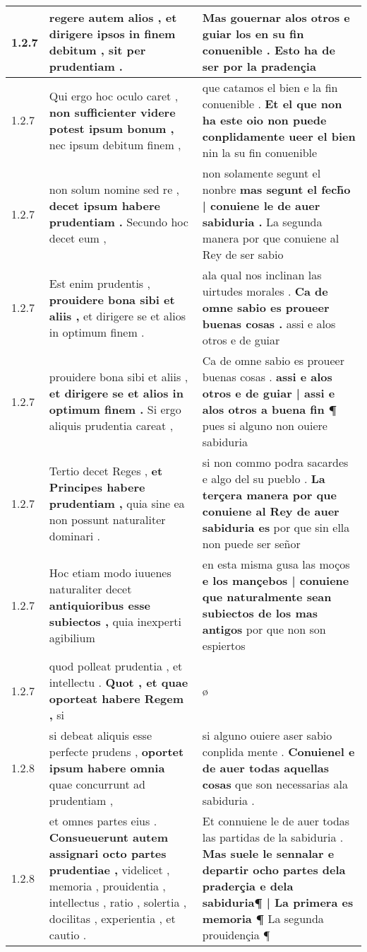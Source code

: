 \begin{tabular}{|p{1cm}|p{6.5cm}|p{6.5cm}|}
1.2.7 & regere autem alios , \textbf{ et dirigere ipsos in finem debitum , } sit per prudentiam . & Mas gouernar alos otros \textbf{ e guiar los en su fin conuenible . } Esto ha de ser por la pradençia \\\hline
1.2.7 & Qui ergo hoc oculo caret , \textbf{ non sufficienter videre potest ipsum bonum , } nec ipsum debitum finem , & que catamos el bien e la fin conuenible . \textbf{ Et el que non ha este oio non puede conplidamente ueer el bien } nin la su fin conuenible \\\hline
1.2.7 & non solum nomine sed re , \textbf{ decet ipsum habere prudentiam . } Secundo hoc decet eum , & non solamente segunt el nonbre \textbf{ mas segunt el fech̃o | conuiene le de auer sabiduria . } La segunda manera por que conuiene al Rey de ser sabio \\\hline
1.2.7 & Est enim prudentis , \textbf{ prouidere bona sibi et aliis , } et dirigere se et alios in optimum finem . & ala qual nos inclinan las uirtudes morales . \textbf{ Ca de omne sabio es proueer buenas cosas . } assi e alos otros e de guiar \\\hline
1.2.7 & prouidere bona sibi et aliis , \textbf{ et dirigere se et alios in optimum finem . } Si ergo aliquis prudentia careat , & Ca de omne sabio es proueer buenas cosas . \textbf{ assi e alos otros e de guiar | assi e alos otros a buena fin ¶ } pues si alguno non ouiere sabiduria \\\hline
1.2.7 & Tertio decet Reges , \textbf{ et Principes habere prudentiam , } quia sine ea non possunt naturaliter dominari . & si non commo podra sacardes e algo del su pueblo . \textbf{ La terçera manera por que conuiene al Rey de auer sabiduria es } por que sin ella non puede ser señor \\\hline
1.2.7 & Hoc etiam modo iuuenes naturaliter decet \textbf{ antiquioribus esse subiectos , } quia inexperti agibilium & en esta misma gusa las moços \textbf{ e los mançebos | conuiene que naturalmente sean subiectos de los mas antigos } por que non son espiertos \\\hline
1.2.7 & quod polleat prudentia , et intellectu . \textbf{ Quot , et quae oporteat habere Regem , } si & ø \\\hline
1.2.8 & si debeat aliquis esse perfecte prudens , \textbf{ oportet ipsum habere omnia } quae concurrunt ad prudentiam , & si alguno ouiere aser sabio conplida mente . \textbf{ Conuienel e de auer todas aquellas cosas } que son necessarias ala sabiduria . \\\hline
1.2.8 & et omnes partes eius . \textbf{ Consueuerunt autem assignari octo partes prudentiae , } videlicet , memoria , prouidentia , intellectus , ratio , solertia , docilitas , experientia , et cautio . & Et connuiene le de auer todas las partidas de la sabiduria . \textbf{ Mas suele le sennalar e departir ocho partes dela praderçia e dela sabiduria¶ | La primera es memoria ¶ } La segunda prouidençia ¶ \\\hline

\end{tabular}
